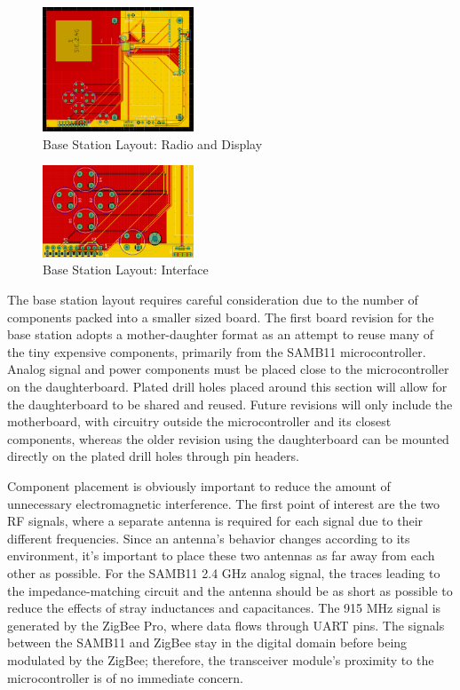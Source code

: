 \documentclass[journal,compsoc]{IEEEtran}
\begin{document}
\begin{figure}[ht] 	%
\centering
\includegraphics[width=0.4\textwidth]{base-layout-full.PNG}
\caption{ \space Base Station Layout: Radio and Display}
\label{base-lay-full}
\end{figure}


\begin{figure}[ht] 	%
\centering
\includegraphics[width=0.4\textwidth]{base-layout-interface.PNG}
\caption{ \space Base Station Layout: Interface}
\label{base-lay-btn}
\end{figure}

The base station layout requires careful consideration due to the number of components packed into a smaller sized board.  The first board revision for the base station adopts a mother-daughter format as an attempt to reuse many of the tiny expensive components, primarily from the SAMB11 microcontroller.  Analog signal and power components must be placed close to the microcontroller on the daughterboard.  Plated drill holes placed around this section will allow for the daughterboard to be shared and reused.  Future revisions will only include the motherboard, with circuitry outside the microcontroller and its closest components, whereas the older revision using the daughterboard can be mounted directly on the plated drill holes through pin headers.

Component placement is obviously important to reduce the amount of unnecessary electromagnetic interference.  The first point of interest are the two RF signals, where a separate antenna is required for each signal due to their different frequencies.  Since an antenna’s behavior changes according to its environment, it’s important to place these two antennas as far away from each other as possible.  For the SAMB11 2.4 GHz analog signal, the traces leading to the impedance-matching circuit and the antenna should be as short as possible to reduce the effects of stray inductances and capacitances.  The 915 MHz signal is generated by the ZigBee Pro, where data flows through UART pins.  The signals between the SAMB11 and ZigBee stay in the digital domain before being modulated by the ZigBee;  therefore, the transceiver module’s proximity to the microcontroller is of no immediate concern.
\end{document}

